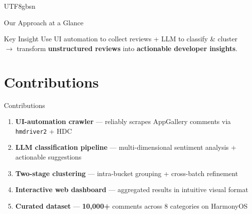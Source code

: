 \documentclass[11pt,aspectratio=169]{beamer}
\newenvironment{benumerate}
  {\setcounter{enumi}{0}\begin{enumerate}}
  {\end{enumerate}}
\begin{document}
\begin{CJK*}{UTF8}{gbsn}
\begin{frame}{Our Approach at a Glance}
  \begin{center}
  \end{center}

  \begin{block}{Key Insight}
    Use UI automation to collect reviews + LLM to classify \& cluster
    $\rightarrow$ transform \textbf{unstructured reviews} into \textbf{actionable developer insights}.
  \end{block}
\end{frame}

\section{Contributions}

\begin{frame}{Contributions}
  \begin{benumerate}
    \item \textbf{UI-automation crawler} --- reliably scrapes AppGallery comments via \texttt{hmdriver2} + HDC
    \item \textbf{LLM classification pipeline} --- multi-dimensional sentiment analysis + actionable suggestions
    \item \textbf{Two-stage clustering} --- intra-bucket grouping + cross-batch refinement
    \item \textbf{Interactive web dashboard} --- aggregated results in intuitive visual format
    \item \textbf{Curated dataset} --- \textbf{10,000+} comments across 8 categories on HarmonyOS
  \end{benumerate}
\end{frame}


\end{CJK*}
\end{document}
